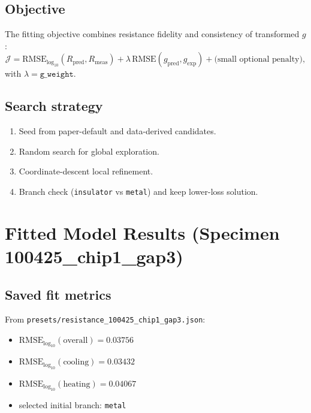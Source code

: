 \documentclass[11pt]{article}
\begin{document}
\subsection{Objective}
The fitting objective combines resistance fidelity and consistency of transformed \(g\):
\begin{equation}
\mathcal{J}=
\mathrm{RMSE}_{\log_{10}}(R_{\text{pred}},R_{\text{meas}})
+\lambda\,\mathrm{RMSE}(g_{\text{pred}},g_{\text{exp}})
+\text{(small optional penalty)},
\end{equation}
with \(\lambda=\texttt{g\_weight}\).

\subsection{Search strategy}
\begin{enumerate}
    \item Seed from paper-default and data-derived candidates.
    \item Random search for global exploration.
    \item Coordinate-descent local refinement.
    \item Branch check (\texttt{insulator} vs \texttt{metal}) and keep lower-loss solution.
\end{enumerate}

\section{Fitted Model Results (Specimen 100425\_chip1\_gap3)}

\subsection{Saved fit metrics}
From \texttt{presets/resistance\_100425\_chip1\_gap3.json}:
\begin{itemize}
    \item \(\mathrm{RMSE}_{\log_{10}}(\text{overall})=0.03756\)
    \item \(\mathrm{RMSE}_{\log_{10}}(\text{cooling})=0.03432\)
    \item \(\mathrm{RMSE}_{\log_{10}}(\text{heating})=0.04067\)
    \item selected initial branch: \texttt{metal}
\end{itemize}
\end{document}
